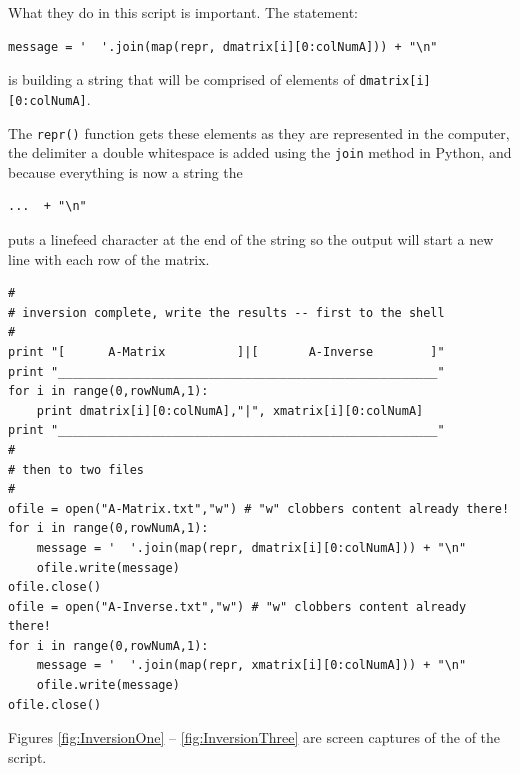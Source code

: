 What they do in this script is important.  The statement:
\begin{verbatim}
message = '  '.join(map(repr, dmatrix[i][0:colNumA])) + "\n" 
\end{verbatim}
is building a string that will be comprised of elements of \texttt{dmatrix[i][0:colNumA]}.  

The \texttt{repr()} function gets these elements as they are represented in the computer, the delimiter a double whitespace is added using the \texttt{join} method in Python, and because everything is now a string the 
\begin{verbatim}
...  + "\n" 
\end{verbatim}

puts a linefeed character at the end of the string so the output will start a new line with each row of the matrix.


\begin{verbatim}
#
# inversion complete, write the results -- first to the shell
#
print "[      A-Matrix          ]|[       A-Inverse        ]"
print "_____________________________________________________"
for i in range(0,rowNumA,1):
    print dmatrix[i][0:colNumA],"|", xmatrix[i][0:colNumA]
print "_____________________________________________________"
#
# then to two files
#
ofile = open("A-Matrix.txt","w") # "w" clobbers content already there!
for i in range(0,rowNumA,1):
    message = '  '.join(map(repr, dmatrix[i][0:colNumA])) + "\n" 
    ofile.write(message)
ofile.close()
ofile = open("A-Inverse.txt","w") # "w" clobbers content already there!
for i in range(0,rowNumA,1):
    message = '  '.join(map(repr, xmatrix[i][0:colNumA])) + "\n"
    ofile.write(message)
ofile.close()
\end{verbatim}

Figures \ref{fig:InversionOne} -- \ref{fig:InversionThree} are screen captures of the of the script.  

